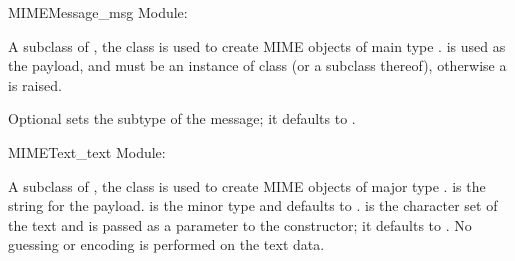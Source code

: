 \begin{classdesc}{MIMEMessage}{_msg}
Module: 

A subclass of , the  class
is used to create MIME objects of main type .
 is used as the payload, and must be an instance of class
 (or a subclass thereof), otherwise a
 is raised.

Optional  sets the subtype of the message; it defaults
to .
\end{classdesc}

\begin{classdesc}{MIMEText}{_text}
Module: 

A subclass of , the  class is
used to create MIME objects of major type .
 is the string for the payload.   is the
minor type and defaults to .   is the
character set of the text and is passed as a parameter to the
 constructor; it defaults to .  No
guessing or encoding is performed on the text data.

\end{classdesc}
